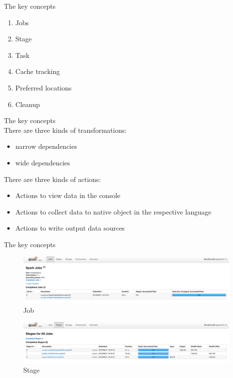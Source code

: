 \begin{frame}[plain,t]{The  key concepts} %
	 \\  \vspace{2ex}
	\begin{enumerate}
		\item Jobs
		\item Stage
		\item Task
		\item Cache tracking
		\item Preferred locations
		\item Cleanup
	\end{enumerate}
\end{frame}
\begin{frame}[plain,t]{The  key concepts} %
	 \\  \vspace{2ex}
	There are three kinds of transformations:
	\begin{itemize}
		\item narrow dependencies
		\item wide dependencies
	\end{itemize}
	
	 \vspace{2ex}
	 
	There are three kinds of actions:
	\begin{itemize}
		\item Actions to view data in the console
		\item Actions to collect data to native object in the respective language
		\item Actions to write output data sources
	\end{itemize}
\end{frame}
\begin{frame}[plain,t]{The  key concepts} %
	 \\ 
	\begin{figure}
		\centering
		\includegraphics[width=0.9\linewidth]{images/p004}
		\caption{Job}
		\label{fig:p004}
	\end{figure}
		\begin{figure}
		\centering
		\includegraphics[width=0.9\linewidth]{images/p005}
		\caption{Stage}
		\label{fig:p005}
	\end{figure}
\end{frame}


